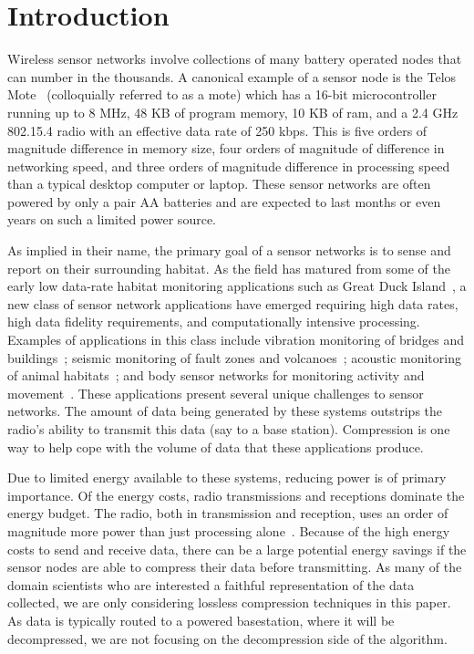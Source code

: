 \section{Introduction} 
\label{sec-intro}

Wireless sensor networks involve collections of many battery operated
nodes that can number in the thousands.  A canonical example of a
sensor node is the Telos Mote~\cite{telos} (colloquially referred to
as a mote) which has a 16-bit microcontroller running up to 8 MHz, 48
KB of program memory, 10 KB of ram, and a 2.4 GHz 802.15.4 radio with
an effective data rate of 250 kbps.  This is five orders of magnitude
difference in memory size, four orders of magnitude of difference in
networking speed, and three orders of magnitude difference in
processing speed than a typical desktop computer or laptop.  These
sensor networks are often powered by only a pair AA batteries and are
expected to last months or even years on such a limited power source.

As implied in their name, the primary goal of a sensor networks is to
sense and report on their surrounding habitat. As the field has
matured from some of the early low data-rate habitat monitoring
applications such as Great Duck Island~\cite{gdi-sensys04}, a new
class of sensor network applications have emerged requiring high data
rates, high data fidelity requirements, and computationally intensive
processing. Examples of applications in this class include vibration
monitoring of bridges and
buildings~\cite{brimon,netshm-spots06,ggb-monitoring}; seismic
monitoring of fault zones and
volcanoes~\cite{ucla-seismic,volcano-osdi06}; acoustic monitoring of
animal habitats~\cite{girod-marmots,enviromic}; and body sensor
networks for monitoring activity and
movement~\cite{intel-msp,satire,parkinsons-embs07}.  These
applications present several unique challenges to sensor networks.
The amount of data being generated by these systems outstrips the
radio's ability to transmit this data (say to a base station).
Compression is one way to help cope with the volume of data that these
applications produce.  

Due to limited energy available to these systems, reducing power is of
primary importance.  Of the energy costs, radio transmissions and
receptions dominate the energy budget.  The radio, both in
transmission and reception, uses an order of magnitude more power than
just processing alone~\cite{telos}.  Because of the high energy costs
to send and receive data, there can be a large potential energy
savings if the sensor nodes are able to compress their data before
transmitting.  As many of the domain scientists who are interested a
faithful representation of the data collected, we are only considering
lossless compression techniques in this paper.  As data is typically
routed to a powered basestation, where it will be decompressed, we are
not focusing on the decompression side of the algorithm.  

